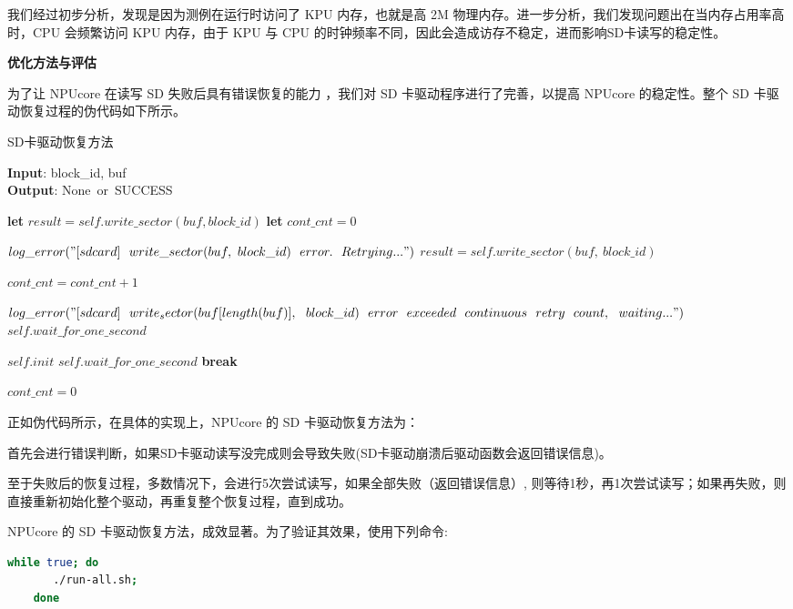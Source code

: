 我们经过初步分析，发现是因为测例在运行时访问了 KPU 内存，也就是高 2M 物理内存。进一步分析，我们发现问题出在当内存占用率高时，CPU 会频繁访问 KPU 内存，由于 KPU 与 CPU 的时钟频率不同，因此会造成访存不稳定，进而影响SD卡读写的稳定性。

\textbf{优化方法与评估}

为了让 NPUcore 在读写 SD 失败后具有错误恢复的能力 ，我们对 SD 卡驱动程序进行了完善，以提高 NPUcore 的稳定性。整个 SD 卡驱动恢复过程的伪代码如下所示。

\begin{algorithm}[tb]
	\caption{SD卡驱动恢复方法}
	\label{alg:sdcard_recovery}
	\textbf{Input}: block\_id, buf\\
	\textbf{Output}: None~or~SUCCESS
	\begin{algorithmic}[1] %
		
		\State \textbf{let} $result = self.write\_sector(buf, block\_id)$
		\State \textbf{let} $cont\_cnt = 0$
		
		\State $log\_error("[sdcard]~~write\_sector(buf,~block\_id)~~error.~~Retrying...")$
		\State $result=self.write\_sector(buf,~block\_id)$
		\EndIf
		
		\State $cont\_cnt = cont\_cnt + 1$
		
		\State $log\_error("[sdcard]~~write_sector(buf[length(buf)],~~block\_id)~~error~~exceeded~~continuous~~retry~~count,~~waiting...")$
		\State $self.wait\_for\_one\_second$
		
		\State $self.init$
		\State $self.wait\_for\_one\_second$
		\Else
		\State \textbf{break}
		\EndIf
		
		\State $cont\_cnt = 0$
		\EndIf
		\EndWhile
	\end{algorithmic}
\end{algorithm}

正如伪代码所示，在具体的实现上，NPUcore 的 SD 卡驱动恢复方法为：

首先会进行错误判断，如果SD卡驱动读写没完成则会导致失败(SD卡驱动崩溃后驱动函数会返回错误信息)。

至于失败后的恢复过程，多数情况下，会进行5次尝试读写，如果全部失败（返回错误信息）, 则等待1秒，再1次尝试读写；如果再失败，则直接重新初始化整个驱动，再重复整个恢复过程，直到成功。

NPUcore 的 SD 卡驱动恢复方法，成效显著。为了验证其效果，使用下列命令:

\begin{lstlisting}[language=bash]
	while true; do 
	   ./run-all.sh; 
	done
\end{lstlisting}

